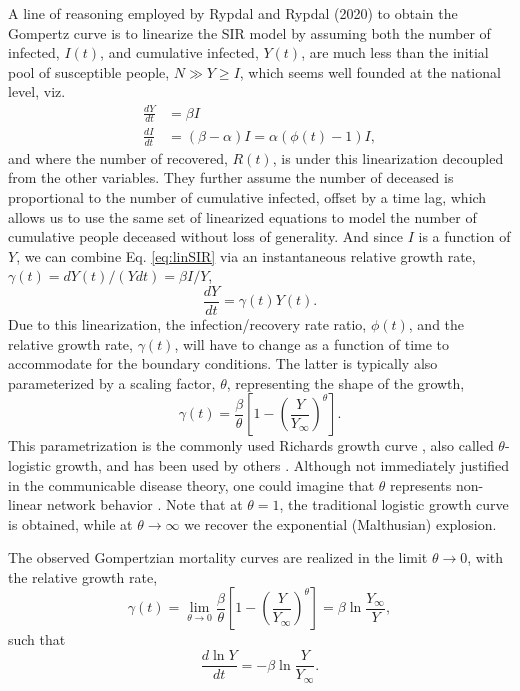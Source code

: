 \documentclass{article}
\begin{document}
A line of reasoning employed by Rypdal and Rypdal (2020) \cite{Rypdal2020} to obtain the Gompertz curve is to linearize the SIR model by assuming
both the number of infected, $I(t)$, and cumulative infected, $Y(t)$, are much less than the initial pool of susceptible people, $N \gg Y \ge I$, which seems well founded at the national level, viz.
\begin{align}
\label{eq:linSIR}
\frac{dY}{dt}& = \beta I\\
\frac{dI}{dt}& = (\beta - \alpha) I = \alpha (\phi(t) - 1) I,
\end{align}
and where the number of recovered, $R(t)$, is under this linearization decoupled from the other variables. They further assume the number of deceased is proportional to the number of cumulative infected, offset by a time lag, which allows us to use the same set of linearized equations to model the number of cumulative people deceased without loss of generality. And since $I$ is a function of $Y$, we can combine Eq. \ref{eq:linSIR} via an instantaneous relative growth rate, $\gamma(t) = dY(t) /(Ydt) = \beta I / Y$, 
\begin{equation}
\frac{dY}{dt} = \gamma(t) Y(t) \label{eq:rypdalODE}.
\end{equation}
Due to this linearization, the infection/recovery rate ratio, $\phi(t)$, and the relative growth rate, $\gamma(t)$, will have to change as a function of time to accommodate for the boundary conditions. The latter is typically also parameterized by a scaling factor, $\theta$, representing the shape of the growth,
\begin{equation}
\label{eq:rypdalGamma}
\gamma(t) = \frac{\beta}{\theta}\left[1 - \left(\frac{Y}{Y_{\infty}}\right)^{\theta} \right].
\end{equation}
This parametrization is the commonly used Richards growth curve \cite{richards1959flexible}, also called $\theta$-logistic growth, and has been used by others \cite{wu2020generalized}. Although not immediately justified in the communicable disease theory, one could imagine that $\theta$ represents non-linear network behavior \cite{petroni2020logistic}. Note that at $\theta=1$, the traditional logistic growth curve is obtained, while at $\theta\rightarrow \infty$ we recover the exponential (Malthusian) explosion.

The observed Gompertzian mortality curves are realized in the limit $\theta \rightarrow 0$, with the relative growth rate, 
\begin{equation}
\label{eq:rypdalLimit}
\gamma(t) = \lim_{\theta \rightarrow 0}\frac{\beta}{\theta}\left[1 - \left(\frac{Y}{Y_{\infty}}\right)^{\theta} \right]
= \beta\ln{\frac{Y_{\infty}}{Y}},
\end{equation}
such that 
\begin{equation}
\frac{d \ln Y}{dt} = -\beta \ln \frac{Y}{Y_\infty} \label{eq:gompertzODEfirst}.
\end{equation}
\end{document}
